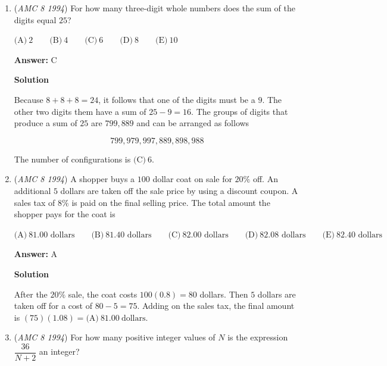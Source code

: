 \begin{enumerate}
 
 \[\angle BDC = 180-100-30=\boxed{\text{(B)}\ 50^\circ}\]




\textbf{Solution 2}

The sum of angles of a quadrilateral is $360^\circ$. Reflex $\angle EDC=360-60-40-30=230^\circ$.  $\angle BDC$ is a straight angle less than Reflex $\angle EDC$. 
 \[\angle BDC =230-180=\boxed{\text{(B)}\ 50^\circ}\]



	\item (\textit{AMC 8 1994}) For how many three-digit whole numbers does the sum of the digits equal $25$?


 $\text{(A)}\ 2 \qquad \text{(B)}\ 4 \qquad \text{(C)}\ 6 \qquad \text{(D)}\ 8 \qquad \text{(E)}\ 10$

 \textbf{Answer: }C



\textbf{Solution}

Because $8+8+8=24$, it follows that one of the digits must be a $9$. The other two digits them have a sum of $25-9=16$. The groups of digits that produce a sum of $25$ are $799, 889$ and can be arranged as follows

 
 \[799,979,997,889,898,988\]

 The number of configurations is $\boxed{\text{(C)}\ 6}$.

 


	\item (\textit{AMC 8 1994}) A shopper buys a $100$ dollar coat on sale for $20\%$ off.  An additional $5$ dollars are taken off the sale price by using a discount coupon.  A sales tax of $8\%$ is paid on the final selling price.  The total amount the shopper pays for the coat is


 $\text{(A)}\ \text{81.00 dollars} \qquad \text{(B)}\ \text{81.40 dollars} \qquad \text{(C)}\ \text{82.00 dollars} \qquad \text{(D)}\ \text{82.08 dollars} \qquad \text{(E)}\ \text{82.40 dollars}$

 \textbf{Answer: }A



\textbf{Solution}

After the $20\%$ sale, the coat costs $100(0.8)=80$ dollars. Then $5$ dollars are taken off for a cost of $80-5=75$. Adding on the sales tax, the final amount is $(75)(1.08)=\boxed{\text{(A)}\ 81.00\ \text{dollars}}$.

 


	\item (\textit{AMC 8 1994}) For how many positive integer values of $N$ is the expression $\dfrac{36}{N+2}$ an integer?



\end{enumerate}
